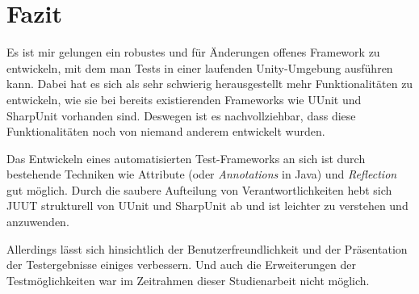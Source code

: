 \chapter{Fazit}

Es ist mir gelungen ein robustes und für Änderungen offenes Framework zu entwickeln, mit dem man Tests in einer laufenden Unity-Umgebung ausführen kann. Dabei hat es sich als sehr schwierig herausgestellt mehr Funktionalitäten zu entwickeln, wie sie bei bereits existierenden Frameworks wie UUnit und SharpUnit vorhanden sind. Deswegen ist es nachvollziehbar, dass diese Funktionalitäten noch von niemand anderem entwickelt wurden.

Das Entwickeln eines automatisierten Test-Frameworks an sich ist durch bestehende Techniken wie Attribute (oder \textit{Annotations} in Java) und \textit{Reflection} gut möglich. Durch die saubere Aufteilung von Verantwortlichkeiten hebt sich JUUT strukturell von UUnit und SharpUnit ab und ist leichter zu verstehen und anzuwenden.

Allerdings lässt sich hinsichtlich der Benutzerfreundlichkeit und der Präsentation der Testergebnisse einiges verbessern. Und auch die Erweiterungen der Testmöglichkeiten war im Zeitrahmen dieser Studienarbeit nicht möglich.